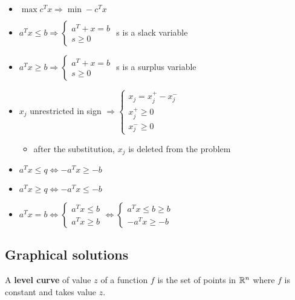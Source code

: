 \documentclass[english]{article}
\begin{document}
\begin{itemize}[parsep=1.25ex]
  \item \(\max c^T x \Rightarrow \min -c^T x\)
  \item \(a^T x \leq b \Rightarrow \begin{cases}
          a^T + x = b \\
          s \geq 0
        \end{cases}\) s is a slack variable
  \item \(a^T x \geq b \Rightarrow \begin{cases}
          a^T + x = b \\
          s \geq 0
        \end{cases}\) s is a surplus variable
  \item \(x_j\) unrestricted in sign \(\Rightarrow \begin{cases}
          x_j = x_j^+ - x_j^- \\
          x_j^+ \geq 0        \\
          x_j^- \geq 0
        \end{cases}\)
        \begin{itemize}[label=\(\rightarrow\)]
          \item after the substitution, \(x_j\) is deleted from the problem
        \end{itemize}
  \item \(a^T x \leq q \Leftrightarrow - a^T x \geq -b\)
  \item \(a^T x \geq q \Leftrightarrow - a^T x \leq -b\)
  \item \(a^T x = b \Leftrightarrow \begin{cases}
          a^T x \leq b \\
          a^T x \geq b
        \end{cases} \Leftrightarrow \begin{cases}
          a^T x \leq b \geq b \\
          -  a^T x \geq - b
        \end{cases}\)
\end{itemize}

\subsection{Graphical solutions}

A \textbf{level curve} of value \(z\) of a function \(f\) is the set of points in \(\mathbb{R}^n\) where \(f\) is constant and takes value \(z\).
\end{document}
